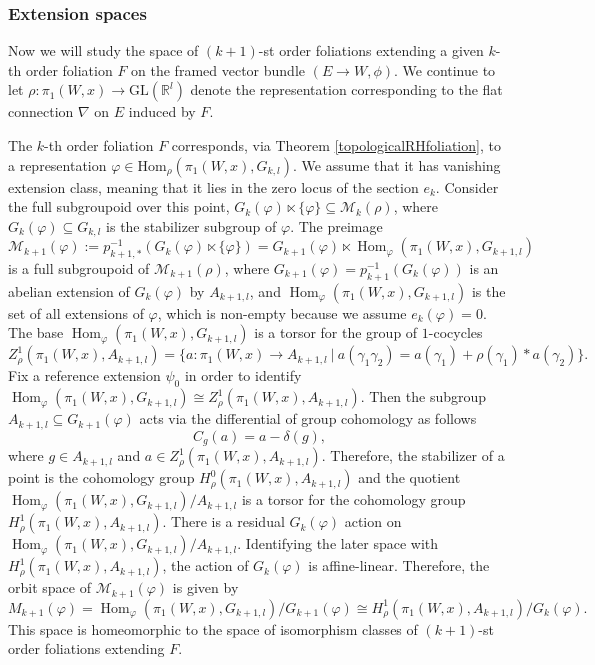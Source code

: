 \documentclass[10pt]{amsart}
\newcommand{\Hom}{\operatorname{Hom}}
\numberwithin{theoremalpha}{section}
\numberwithin{equation}{section}
\numberwithin{definition}{section}
\numberwithin{theorem}{section}
\numberwithin{proposition}{section}
\numberwithin{lemma}{section}
\numberwithin{example}{section}
\numberwithin{remark}{section}
\numberwithin{corollary}{section}
\numberwithin{question}{section}
\numberwithin{problem}{section}
\numberwithin{assumption}{section}
\theoremstyle{named}
\numberwithin{equation}{section}
\begin{document}
\subsubsection{Extension spaces}
Now we will study the space of $(k+1)$-st order foliations extending a given $k$-th order foliation $F$ on the framed vector bundle $(E \to W,\phi)$. We continue to let $\rho : \pi_{1}(W,x) \to \mathrm{GL}(\mathbb{R}^l)$ denote the representation corresponding to the flat connection $\nabla$ on $E$ induced by $F$.

The $k$-th order foliation $F$ corresponds, via Theorem \ref{topologicalRHfoliation}, to a representation $\varphi \in \mathrm{Hom}_{\rho}(\pi_{1}(W,x), G_{k,l})$. We assume that it has vanishing extension class, meaning that it lies in the zero locus of the section $e_{k}$. Consider the full subgroupoid over this point, $G_{k}(\varphi) \ltimes \{ \varphi \} \subseteq \mathcal{M}_{k}(\rho)$, where $G_{k}(\varphi) \subseteq G_{k,l}$ is the stabilizer subgroup of $\varphi$. The preimage 
\[
\mathcal{M}_{k+1}(\varphi) := p_{k+1, *}^{-1}(G_{k}(\varphi) \ltimes \{ \varphi \}) = G_{k+1}(\varphi) \ltimes \Hom_{\varphi}(\pi_1(W, x), G_{k+1,l})
\]
is a full subgroupoid of $\mathcal{M}_{k+1}(\rho)$, where $G_{k+1}(\varphi) = p_{k+1}^{-1}(G_{k}(\varphi))$ is an abelian extension of $G_{k}(\varphi)$ by $A_{k+1,l}$, and $\Hom_{\varphi}(\pi_1(W, x), G_{k+1,l})$ is the set of all extensions of $\varphi$, which is non-empty because we assume $e_k(\varphi) = 0$. The base $\Hom_{\varphi}(\pi_1(W, x), G_{k+1,l})$ is a torsor for the group of $1$-cocycles 
\[
Z_{\rho}^{1}(\pi_{1}(W,x), A_{k+1, l}) = \{ a : \pi_{1}(W, x) \to A_{k+1,l} \ | \ a(\gamma_1 \gamma_2) = a(\gamma_1) + \rho(\gamma_1) \ast a(\gamma_2) \}. 
\]
Fix a reference extension $\psi_0$ in order to identify $\Hom_{\varphi}(\pi_1(W, x), G_{k+1,l}) \cong Z_{\rho}^{1}(\pi_{1}(W,x), A_{k+1, l})$. Then the subgroup $A_{k+1, l} \subseteq G_{k+1}(\varphi)$ acts via the differential of group cohomology as follows 
\[
C_{g}(a) = a - \delta(g),
\]
where $g \in A_{k+1, l}$ and $a \in Z_{\rho}^{1}(\pi_{1}(W,x), A_{k+1, l})$. Therefore, the stabilizer of a point is the cohomology group $H_{\rho}^0(\pi_{1}(W,x), A_{k+1,l})$ and the quotient $\Hom_{\varphi}(\pi_1(W, x), G_{k+1,l})/A_{k+1,l}$ is a torsor for the cohomology group $H_{\rho}^1(\pi_{1}(W,x), A_{k+1,l})$. There is a residual $G_{k}(\varphi)$ action on $\Hom_{\varphi}(\pi_1(W, x), G_{k+1,l})/A_{k+1,l}$. Identifying the later space with $H_{\rho}^1(\pi_{1}(W,x), A_{k+1,l})$, the action of $G_{k}(\varphi)$ is affine-linear. Therefore, the orbit space of $\mathcal{M}_{k+1}(\varphi)$ is given by 
\[
M_{k+1}(\varphi) = \Hom_{\varphi}(\pi_1(W, x), G_{k+1,l})/G_{k+1}(\varphi) \cong H_{\rho}^1(\pi_{1}(W,x), A_{k+1,l})/G_{k}(\varphi). 
\]
This space is homeomorphic to the space of isomorphism classes of $(k+1)$-st order foliations extending $F$. 
\end{document}
